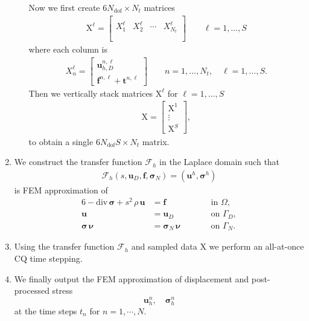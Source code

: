 \documentclass[12pt,english]{article}
\numberwithin{equation}{section}
\newcommand{\bs}[1]{\boldsymbol{#1}}
\newcommand{\Ndof}{N_{\mathrm{dof}}}
\newcommand{\mb}{\mathbf}
\newcommand{\mc}{\mathcal}
\newcommand{\mr}{\mathrm}
\begin{document}
\begin{enumerate}
\begin{enumerate}
		Now we first create $6 \Ndof \times N_t$ matrices
		\begin{align*}
		\mr X^\ell = \left[ \begin{array}{c|c|c|c}
			&	 & 		& 	\\
		X_1^\ell  & X_2^\ell & \cdots & X_{N_t}^\ell\\
			&	 & 		& 	\\		
		\end{array} \right] \qquad \ell = 1, \ldots, S
		\end{align*}
	where each column is
		\begin{align*}
			X^\ell_n = \left[ \begin{array}{c}
			\mb u^{n,\ell}_{h,D} \\[1em]
			\mb f^{n,\ell} + \mb t^{n,\ell}
			\end{array} \right ] \qquad n = 1,\ldots,N_t, \quad \ell = 1,\ldots,S.
		\end{align*}
	Then we vertically stack matrices $\mr X^\ell$ for $\ell = 1,\ldots,S$
		\begin{align*}
			\mr X = \left[ \begin{array}{c}
			\mr X^1 \\[1em]
			\vdots \\[1em]
			\mr X^S
			\end{array} \right ],
		\end{align*}
	to obtain a single $6 \Ndof S \times N_t$ matrix.

\end{enumerate}
	
\item 
We construct the transfer function $\mc F_h$ in the Laplace domain such that
\begin{align*}
		\mc F_h(s,\mb u_D,\mb f,\bs \sigma_N) = (\mb u^h, \bs \sigma^h)
	\end{align*}
is FEM approximation of
	\begin{alignat*}{6}
	-\mathrm{div}\,\boldsymbol\sigma+s^2\,\rho\, \mathbf u &=\mathbf f
	&\qquad &\mbox{in $\Omega$},\\
	\mathbf u &=\mathbf u_D &\qquad&\mbox{on $\Gamma_D$},\\
	\boldsymbol\sigma\,\boldsymbol\nu &=\boldsymbol\sigma_N\,\boldsymbol\nu
	&\qquad&\mbox{on $\Gamma_N$}.
	\end{alignat*}
\item
Using the transfer function $\mc F_h$ and sampled data $\mr X$ we perform an all-at-once CQ time stepping.
\item
We finally output the FEM approximation of displacement and post-processed stress 
	\[
		\mb u^n_h, \quad \bs \sigma^n_h
	\]
at the time steps $t_n$ for $n = 1, \cdots, N$. 
\end{enumerate}
\end{document}
